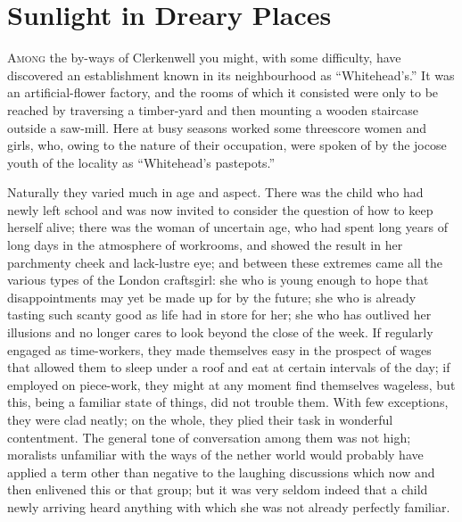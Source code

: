 \chapter{Sunlight in Dreary Places}

\textsc{Among} the by-ways of Clerkenwell you might, with some
difficulty, have discovered an establishment known in its neighbourhood
as ``Whitehead's.'' It was an artificial-flower factory, and the rooms
of which it consisted were only to be reached by traversing a
timber-yard and then mounting a wooden staircase outside a saw-mill.
Here at busy seasons worked some threescore women and girls, who, owing
to the nature of their occupation, were spoken of by the jocose youth of
the locality as ``Whitehead's pastepots.''

Naturally they varied much in age and aspect. There was the child who
had newly left school and was now invited to consider the question of
how to keep herself alive; there was the woman of uncertain age, who
{}had spent long years of long days in the atmosphere of workrooms, and
showed the result in her parchmenty cheek and lack-lustre eye; and
between these extremes came all the various types of the London
craftsgirl: she who is young enough to hope that disappointments may yet
be made up for by the future; she who is already tasting such scanty
good as life had in store for her; she who has outlived her illusions
and no longer cares to look beyond the close of the week. If regularly
engaged as time-workers, they made themselves easy in the prospect of
wages that allowed them to sleep under a roof and eat at certain
intervals of the day; if employed on piece-work, they might at any
moment find themselves wageless, but this, being a familiar state of
things, did not trouble them. With few exceptions, they were clad
neatly; on the whole, they plied their task in wonderful contentment.
The general tone of conversation among them was not high; moralists
unfamiliar with the ways of the nether world would probably have applied
a term other {}than negative to the laughing discussions which now and
then enlivened this or that group; but it was very seldom indeed that a
child newly arriving heard anything with which she was not already
perfectly familiar.


